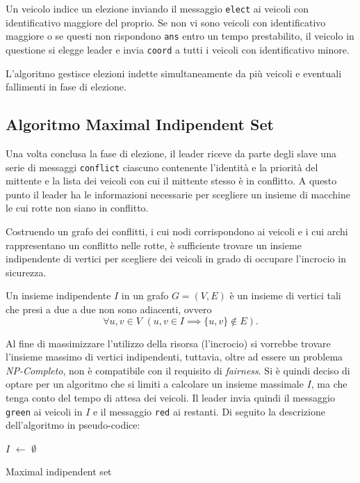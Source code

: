 \documentclass{memoir}
\begin{document}
Un veicolo indice un elezione inviando il messaggio \texttt{elect} ai veicoli
con identificativo maggiore del proprio. Se non vi sono veicoli con
identificativo maggiore o se questi non rispondono \texttt{ans} entro un tempo
prestabilito, il veicolo in questione si elegge leader e invia \texttt{coord} a
tutti i veicoli con identificativo minore.

L'algoritmo gestisce elezioni indette simultaneamente da più veicoli e eventuali
fallimenti in fase di elezione.

\subsection{Algoritmo Maximal Indipendent Set}
Una volta conclusa la fase di elezione, il leader riceve da parte degli slave
una serie di messaggi \texttt{conflict} ciascuno contenente l'identità e la
priorità del mittente e la lista dei veicoli con cui il mittente stesso è in
conflitto. A questo punto il leader ha le informazioni necessarie per scegliere
un insieme di macchine le cui rotte non siano in conflitto.

Costruendo un grafo dei conflitti, i cui nodi corrispondono ai veicoli e i cui
archi rappresentano un conflitto nelle rotte, è sufficiente trovare un insieme
indipendente di vertici per scegliere dei veicoli in grado di occupare
l'incrocio in sicurezza.

Un insieme indipendente $I$ in un grafo $G=(V,E)$ è un insieme di vertici tali
che presi a due a due non sono adiacenti, ovvero
\[\forall u,v \in V \, \, (u, v \in I \implies \{u,v\} \not\in E).\]

Al fine di massimizzare l'utilizzo della risorsa (l'incrocio) si vorrebbe
trovare l'insieme massimo di vertici indipendenti, tuttavia, oltre ad essere un
problema \emph{NP-Completo}, non è compatibile con il requisito di
\emph{fairness}. Si è quindi deciso di optare per un algoritmo che si limiti a
calcolare un insieme massimale $I$, ma che tenga conto del tempo di attesa dei
veicoli. Il leader invia quindi il messaggio \texttt{green} ai veicoli in $I$ e
il messaggio \texttt{red} ai restanti. Di seguito la descrizione dell'algoritmo
in pseudo-codice:

\begin{algorithm}

\SetAlgoLined
{}
$I$ $\leftarrow$ $\emptyset$\;
\;
\caption{Maximal indipendent set}
\end{algorithm}
\end{document}
